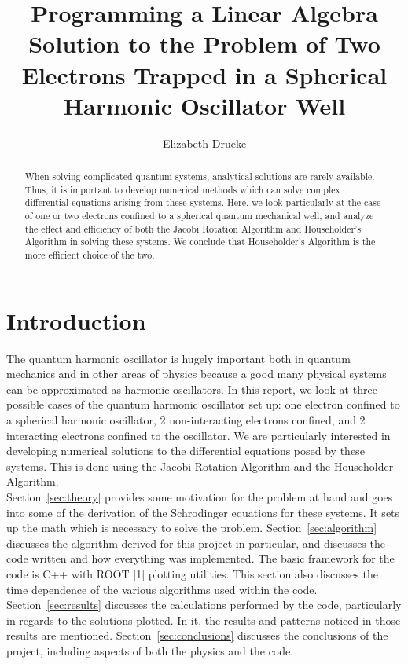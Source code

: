\documentclass[12pt]{article}
\title{Programming a Linear Algebra Solution to the Problem of Two Electrons Trapped in a Spherical Harmonic Oscillator Well}
\author{Elizabeth Drueke}
\numberwithin{equation}{section}
\begin{document}
\maketitle

\begin{abstract}
When solving complicated quantum systems, analytical solutions are rarely available.  Thus, it is important to develop numerical methods which can solve complex differential equations arising from these systems.  Here, we look particularly at the case of one or two electrons confined to a spherical quantum mechanical well, and analyze the effect and efficiency of both the Jacobi Rotation Algorithm and Householder's Algorithm in solving these systems.  We conclude that Householder's Algorithm is the more efficient choice of the two.
\end{abstract}

\section{Introduction}
\label{sec:into}
The quantum harmonic oscillator is hugely important both in quantum mechanics and in other areas of physics because a good many physical systems can be approximated as harmonic oscillators.  In this report, we look at three possible cases of the quantum harmonic oscillator set up: one electron confined to a spherical harmonic oscillator, 2 non-interacting electrons confined, and 2 interacting electrons confined to the oscillator.  We are particularly interested in developing numerical solutions to the differential equations posed by these systems.  This is done using the Jacobi Rotation Algorithm and the Householder Algorithm.  
\\\indent Section~\ref{sec:theory} provides some motivation for the problem at hand and goes into some of the derivation of the Schrodinger equations for these systems.  It sets up the math which is necessary to solve the problem.  Section~\ref{sec:algorithm} discusses the algorithm derived for this project in particular, and discusses the code written and how everything was implemented.  The basic framework for the code is C++ with ROOT [1] plotting utilities.  This section also discusses the time dependence of the various algorithms used within the code.  Section~\ref{sec:results} discusses the calculations performed by the code, particularly in regards to the solutions plotted.  In it, the results and patterns noticed in those results are mentioned.  Section~\ref{sec:conclusions} discusses the conclusions of the project, including aspects of both the physics and the code.
\end{document}
